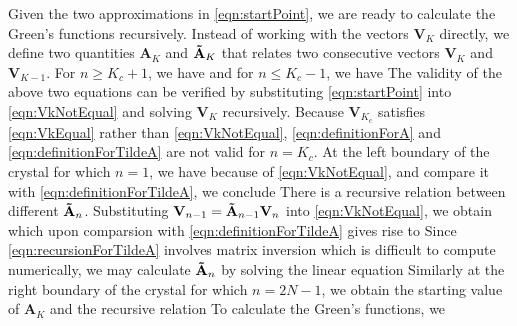 Given the two approximations in \autoref{eqn:startPoint}, we are ready to calculate the Green's functions
 recursively. Instead of working with the vectors $\mathbf{V}_{K}$ directly, we define two quantities 
$\mathbf{A}_{K}$ and $\mathbf{\Tilde{A}}_{K} $ that relates
two consecutive vectors $\mathbf{V}_{K}$ and $\mathbf{V}_{K-1}$. For $n \ge K_c + 1$, we have
and for $n \le K_c - 1$, we have
The validity of the above two equations can be verified by substituting \autoref{eqn:startPoint} into
 \autoref{eqn:VkNotEqual} and solving $\mathbf{V}_{K}$ recursively. Because $\mathbf{V}_{K_c}$ satisfies 
\autoref{eqn:VkEqual} rather than \autoref{eqn:VkNotEqual}, \autoref{eqn:definitionForA} and 
\autoref{eqn:definitionForTildeA} are not valid for $n = K_c$. At the left boundary of the crystal for which $n=1$, we have
because of \autoref{eqn:VkNotEqual}, and compare it with \autoref{eqn:definitionForTildeA}, we conclude 
There is a recursive relation between different $\mathbf{\Tilde{A}}_{n}$. Substituting 
$\mathbf{V}_{n-1} = \mathbf{\Tilde{A}}_{n-1} \mathbf{V}_{n} $ into \autoref{eqn:VkNotEqual}, we obtain
which upon comparsion with \autoref{eqn:definitionForTildeA} gives rise to
Since \autoref{eqn:recursionForTildeA} involves matrix inversion which is difficult to compute numerically, we may calculate
$\mathbf{\Tilde{A}}_{n}$ by solving the linear equation
Similarly at the right boundary of the crystal for which $n=2N-1$, we obtain the starting value of $\mathbf{A}_{K}$
and the recursive relation
To calculate the Green's functions, we  
